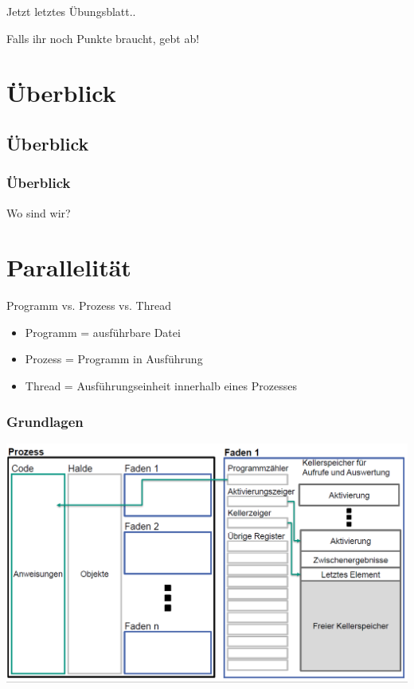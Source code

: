 \documentclass[18pt]{beamer}
\begin{document}
	\begin{frame}{Jetzt letztes Übungsblatt..}
		\begin{huge}
			Falls ihr noch Punkte braucht, gebt ab!
		\end{huge}
\end{frame}

\section{Überblick}
	\subsection{Überblick}
	\begin{frame}
		\frametitle{Überblick}
		\centering \huge Wo sind wir?
	\end{frame}
	
	
\section{Parallelität}
	
	\begin{frame}{Programm vs. Prozess vs. Thread}
		\begin{itemize}
			\item Programm = ausführbare Datei
			\item Prozess = Programm in Ausführung
			\item Thread = Ausführungseinheit innerhalb eines Prozesses
		\end{itemize}
	\end{frame}
	
	\begin{frame}
		\frametitle{Grundlagen}
		\includegraphics[scale=0.34]{./pics/tut5/proc-thr.png}
	\end{frame}
\end{document}
